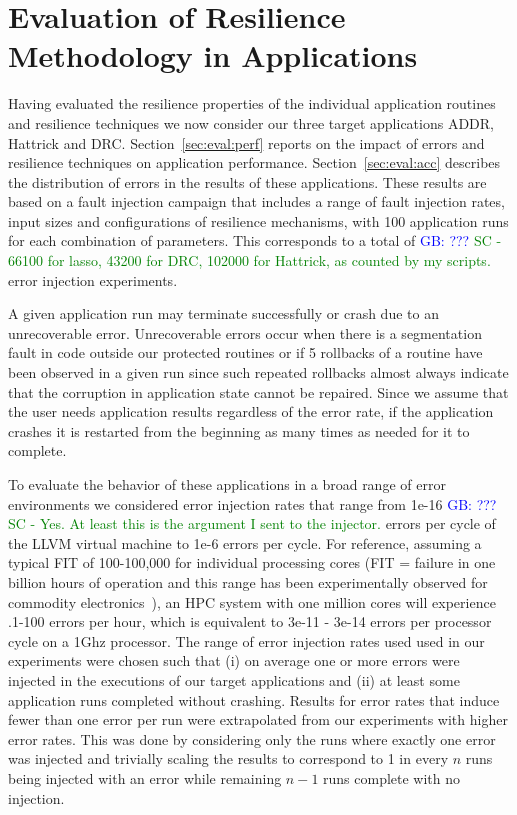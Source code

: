\documentclass{sig-alternate}
\newcommand{\sui}[1]{%
  \textcolor{green}{SC - #1}
}
\newcommand{\greg}[1]{%
  \textcolor{blue}{GB: #1}
}
\begin{document}
\section{Evaluation of Resilience Methodology in Applications}
\label{sec:eval}

Having evaluated the resilience properties of the individual application routines and resilience techniques we now consider our three target applications ADDR, Hattrick and DRC.
Section~\ref{sec:eval:perf} reports on the impact of errors and resilience techniques on application performance. Section~\ref{sec:eval:acc} describes the distribution of errors in the results of these applications.
These results are based on a fault injection campaign that includes a range of fault injection rates, input sizes and configurations of resilience mechanisms, with 100 application runs for each combination of parameters.
This corresponds to a total of \greg{???} \sui{66100 for lasso, 43200 for DRC, 102000 for Hattrick, as counted by my scripts.} error injection experiments.

A given application run may terminate successfully or crash due to an unrecoverable error.
Unrecoverable errors occur when there is a segmentation fault in code outside our protected routines or if 5 rollbacks of a routine have been observed in a given run since such repeated rollbacks almost always indicate that the corruption in application state cannot be repaired.
Since we assume that the user needs application results regardless of the error rate, if the application crashes it is restarted from the beginning as many times as needed for it to complete.

To evaluate the behavior of these applications in a broad range of error environments we considered error injection rates that range from 1e-16 \greg{???}\sui{Yes. At least this is the argument I sent to the injector.} errors per cycle of the LLVM virtual machine to 1e-6 errors per cycle.
For reference, assuming a typical FIT of 100-100,000 for individual processing cores (FIT = failure in one billion hours of operation and this range has been experimentally observed for commodity electronics~\cite{mem_errors:2010, DRAMerr:2009}), an HPC system with one million cores will experience .1-100 errors per hour, which is equivalent to 3e-11 - 3e-14 errors per processor cycle on a 1Ghz processor.
The range of error injection rates used used in our experiments were chosen such that (i) on average one or more errors were injected in the executions of our target applications and (ii) at least some application runs completed without crashing.
Results for error rates that induce fewer than one error per run were extrapolated from our experiments with higher error rates.
This was done by considering only the runs where exactly one error was injected and trivially scaling the results to correspond to 1 in every $n$ runs being injected with an error while remaining $n-1$ runs complete with no injection.
\end{document}
